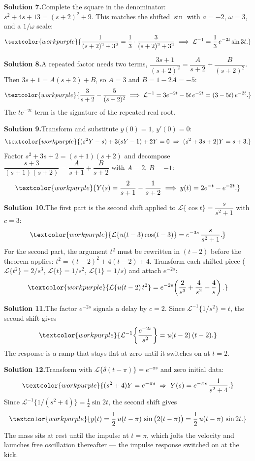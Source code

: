 \medskip
\noindent\textbf{Solution 7.}\quad Complete the square in the denominator:
$s^2+4s+13 = (s+2)^2 + 9$. This matches the shifted $\sin$ with $a=-2$, $\omega=3$,
and a $1/\omega$ scale:
\[ \textcolor{workpurple}{\frac{1}{(s+2)^2+3^2}
   = \frac{1}{3}\cdot\frac{3}{(s+2)^2+3^2}
   \;\Longrightarrow\; \mathcal{L}^{-1} = \frac{1}{3}\,e^{-2t}\sin 3t.} \]

\medskip
\noindent\textbf{Solution 8.}\quad A repeated factor needs two terms,
$\dfrac{3s+1}{(s+2)^2} = \dfrac{A}{s+2} + \dfrac{B}{(s+2)^2}$. Then
$3s+1 = A(s+2)+B$, so $A=3$ and $B = 1-2A = -5$:
\[ \textcolor{workpurple}{\frac{3}{s+2} - \frac{5}{(s+2)^2}
   \;\Longrightarrow\; \mathcal{L}^{-1} = 3e^{-2t} - 5t\,e^{-2t} = (3-5t)\,e^{-2t}.} \]
The $t e^{-2t}$ term is the signature of the repeated real root.

\medskip
\noindent\textbf{Solution 9.}\quad Transform and substitute $y(0)=1$, $y'(0)=0$:
\[ \textcolor{workpurple}{(s^2 Y - s) + 3(sY - 1) + 2Y = 0
   \;\Rightarrow\; (s^2+3s+2)Y = s+3.} \]
Factor $s^2+3s+2=(s+1)(s+2)$ and decompose
$\dfrac{s+3}{(s+1)(s+2)} = \dfrac{A}{s+1}+\dfrac{B}{s+2}$ with $A=2$, $B=-1$:
\[ \textcolor{workpurple}{Y(s) = \frac{2}{s+1} - \frac{1}{s+2}
   \;\Longrightarrow\; y(t) = 2e^{-t} - e^{-2t}.} \]

\medskip
\noindent\textbf{Solution 10.}\quad The first part is the second shift applied to
$\mathcal{L}\{\cos t\}=\dfrac{s}{s^2+1}$ with $c=3$:
\[ \textcolor{workpurple}{\mathcal{L}\{u(t-3)\cos(t-3)\} = e^{-3s}\,\frac{s}{s^2+1}.} \]
For the second part, the argument $t^2$ must be rewritten in $(t-2)$ before the
theorem applies: $t^2 = (t-2)^2 + 4(t-2) + 4$. Transform each shifted piece
($\mathcal{L}\{t^2\}=2/s^3$, $\mathcal{L}\{t\}=1/s^2$, $\mathcal{L}\{1\}=1/s$) and
attach $e^{-2s}$:
\[ \textcolor{workpurple}{\mathcal{L}\{u(t-2)\,t^2\}
   = e^{-2s}\!\left(\frac{2}{s^3} + \frac{4}{s^2} + \frac{4}{s}\right).} \]

\medskip
\noindent\textbf{Solution 11.}\quad The factor $e^{-2s}$ signals a delay by $c=2$.
Since $\mathcal{L}^{-1}\{1/s^2\}=t$, the second shift gives
\[ \textcolor{workpurple}{\mathcal{L}^{-1}\!\left\{\frac{e^{-2s}}{s^2}\right\}
   = u(t-2)\,(t-2).} \]
The response is a ramp that stays flat at zero until it switches on at $t=2$.

\medskip
\noindent\textbf{Solution 12.}\quad Transform with $\mathcal{L}\{\delta(t-\pi)\}=e^{-\pi s}$
and zero initial data:
\[ \textcolor{workpurple}{(s^2+4)Y = e^{-\pi s}
   \;\Rightarrow\; Y(s) = e^{-\pi s}\,\frac{1}{s^2+4}.} \]
Since $\mathcal{L}^{-1}\{1/(s^2+4)\} = \tfrac{1}{2}\sin 2t$, the second shift gives
\[ \textcolor{workpurple}{y(t) = \frac{1}{2}\,u(t-\pi)\,\sin\big(2(t-\pi)\big)
   = \frac{1}{2}\,u(t-\pi)\,\sin 2t.} \]
The mass sits at rest until the impulse at $t=\pi$, which jolts the velocity and
launches free oscillation thereafter --- the impulse response switched on at the kick.

